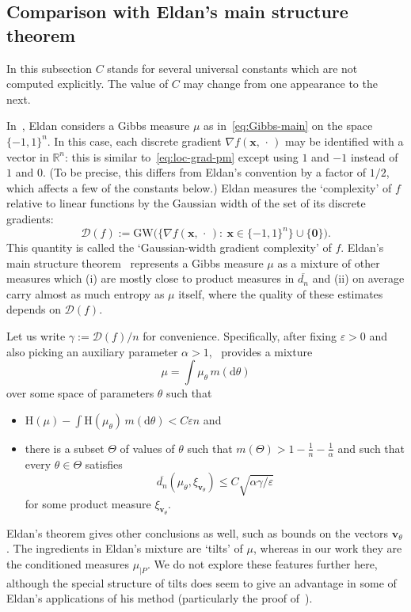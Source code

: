 \documentclass[aop,preprint]{imsart}
\theoremstyle{remark}
\renewcommand{\bf}[1]{\boldsymbol{#1}}
\renewcommand{\rm}[1]{\mathrm{#1}}
\renewcommand{\cal}[1]{\mathcal{#1}}
\newcommand{\bbR}{\mathbb{R}}
\newcommand{\rmH}{\mathrm{H}}
\renewcommand{\d}{\mathrm{d}}
\renewcommand{\a}{\alpha}
\newcommand{\eps}{\varepsilon}
\newcommand{\g}{\gamma}
\newcommand{\ol}[1]{\overline{#1}}
\begin{document}
\subsection{Comparison with Eldan's main structure theorem}\label{subs:Eldan-compar}

In this subsection $C$ stands for several universal constants which are not computed explicitly.  The value of $C$ may change from one appearance to the next.

In~\cite{Eld--GWcomp}, Eldan considers a Gibbs measure $\mu$ as in~\eqref{eq:Gibbs-main} on the space $\{-1,1\}^n$. In this case, each discrete gradient $\nabla f(\bf{x},\,\cdot\,)$ may be identified with a vector in $\bbR^n$: this is similar to~\eqref{eq:loc-grad-pm} except using $1$ and $-1$ instead of $1$ and $0$. (To be precise, this differs from Eldan's convention by a factor of $1/2$, which affects a few of the constants below.)  Eldan measures the `complexity' of $f$ relative to linear functions by the Gaussian width of the set of its discrete gradients:
\[\cal{D}(f) := \rm{GW}\big(\big\{\nabla f(\bf{x},\,\cdot\,):\ \bf{x} \in \{-1,1\}^n\big\} \cup \{\bf{0}\}\big).\]
This quantity is called the `Gaussian-width gradient complexity' of $f$.  Eldan's main structure theorem~\cite[Theorem 3]{Eld--GWcomp} represents a Gibbs measure $\mu$ as a mixture of other measures which (i) are mostly close to product measures in $\ol{d_n}$ and (ii) on average carry almost as much entropy as $\mu$ itself, where the quality of these estimates depends on $\cal{D}(f)$.

Let us write $\g := \cal{D}(f)/n$ for convenience.  Specifically, after fixing $\eps > 0$ and also picking an auxiliary parameter $\a > 1$,~\cite[Theorem 3]{Eld--GWcomp} provides a mixture
\[\mu = \int \mu_\theta\,m(\d\theta)\]
over some space of parameters $\theta$ such that
\begin{itemize}
	\item[i)] $\rmH(\mu) - \int \rmH(\mu_\theta)\,m(\d\theta) < C\eps n$ and
	\item[ii)] there is a subset $\Theta$ of values of $\theta$ such that $m(\Theta) > 1 - \frac{1}{n} - \frac{1}{\a}$ and such that every $\theta \in \Theta$ satisfies
	\[\ol{d_n}(\mu_\theta,\xi_{\bf{v}_\theta}) \leq C\sqrt{\a\g/\eps}\]
	for some product measure $\xi_{\bf{v}_\theta}$.
\end{itemize}

Eldan's theorem gives other conclusions as well, such as bounds on the vectors $\bf{v}_\theta$.  The ingredients in Eldan's mixture are `tilts' of $\mu$, whereas in our work they are the conditioned measures $\mu_{|P}$.  We do not explore these features further here, although the special structure of tilts does seem to give an advantage in some of Eldan's applications of his method (particularly the proof of~\cite[Theorem 1]{Eld--GWcomp}).
\end{document}
